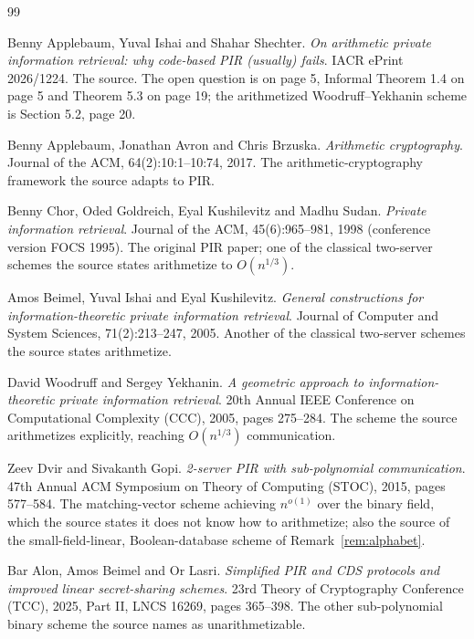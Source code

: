 \documentclass{aicr-conjecture}
\begin{document}
\begin{aicrbibliography}{99}

Benny Applebaum, Yuval Ishai and Shahar Shechter.
\emph{On arithmetic private information retrieval: why code-based PIR
(usually) fails}.
IACR ePrint 2026/1224.
The source. The open question is on page 5, Informal Theorem 1.4 on
page 5 and Theorem 5.3 on page 19; the arithmetized
Woodruff--Yekhanin scheme is Section 5.2, page 20.

Benny Applebaum, Jonathan Avron and Chris Brzuska.
\emph{Arithmetic cryptography}.
Journal of the ACM, 64(2):10:1--10:74, 2017.
The arithmetic-cryptography framework the source adapts to PIR\@.

Benny Chor, Oded Goldreich, Eyal Kushilevitz and Madhu Sudan.
\emph{Private information retrieval}.
Journal of the ACM, 45(6):965--981, 1998 (conference version FOCS 1995).
The original PIR paper; one of the classical two-server schemes the
source states arithmetize to $O(n^{1/3})$.

Amos Beimel, Yuval Ishai and Eyal Kushilevitz.
\emph{General constructions for information-theoretic private
information retrieval}.
Journal of Computer and System Sciences, 71(2):213--247, 2005.
Another of the classical two-server schemes the source states
arithmetize.

David Woodruff and Sergey Yekhanin.
\emph{A geometric approach to information-theoretic private information
retrieval}.
20th Annual IEEE Conference on Computational Complexity (CCC), 2005,
pages 275--284.
The scheme the source arithmetizes explicitly, reaching $O(n^{1/3})$
communication.

Zeev Dvir and Sivakanth Gopi.
\emph{2-server PIR with sub-polynomial communication}.
47th Annual ACM Symposium on Theory of Computing (STOC), 2015, pages
577--584.
The matching-vector scheme achieving $n^{o(1)}$ over the binary field,
which the source states it does not know how to arithmetize; also the
source of the small-field-linear, Boolean-database scheme of
Remark~\ref{rem:alphabet}.

Bar Alon, Amos Beimel and Or Lasri.
\emph{Simplified PIR and CDS protocols and improved linear
secret-sharing schemes}.
23rd Theory of Cryptography Conference (TCC), 2025, Part II, LNCS 16269,
pages 365--398.
The other sub-polynomial binary scheme the source names as
unarithmetizable.


\end{aicrbibliography}
\end{document}

